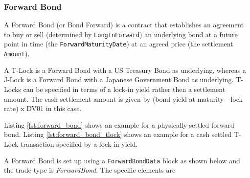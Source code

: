 \subsubsection{Forward Bond}
\label{ss:forwardbond}

A Forward Bond (or Bond Forward) is a contract that establishes an agreement to buy or sell (determined by
\lstinline!LongInForward!) an underlying bond at a future point in time (the {\tt ForwardMaturityDate}) at an agreed
price (the settlement {\tt Amount}).

A T-Lock is a Forward Bond with a US Treasury Bond as underlying, whereas a J-Lock is a Forward Bond with a Japanese
Government Bond as underlying. T-Locks can be specified in terms of a lock-in yield rather then a settlement
amount. The cash settlement amount is given by (bond yield at maturity - lock rate) x DV01 in this case.

Listing \ref{lst:forward_bond} shows an example for a physically settled forward bond. Listing
\ref{lst:forward_bond_tlock} shows an example for a cash settled T-Lock transaction specified by a lock-in yield.

A Forward Bond is set up using a {\tt ForwardBondData} block as shown below and the trade type is
\emph{ForwardBond}. The specific elements are


